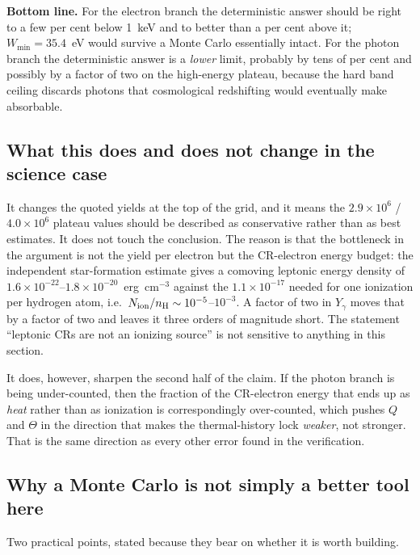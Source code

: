 \documentclass[11pt,a4paper]{article}
\begin{document}
\noindent
\textbf{Bottom line.}  For the electron branch the deterministic answer should
be right to a few per cent below 1~keV and to better than a per cent above it;
$W_{\min}=35.4$~eV would survive a Monte Carlo essentially intact.  For the
photon branch the deterministic answer is a \emph{lower} limit, probably by
tens of per cent and possibly by a factor of two on the high-energy plateau,
because the hard band ceiling discards photons that cosmological redshifting
would eventually make absorbable.

\subsection{What this does and does not change in the science case}

It changes the quoted yields at the top of the grid, and it means the
$2.9\times10^6$ / $4.0\times10^6$ plateau values should be described as
conservative rather than as best estimates.  It does not touch the conclusion.
The reason is that the bottleneck in the argument is not the yield per
electron but the CR-electron energy budget: the independent star-formation
estimate gives a comoving leptonic energy density of
$1.6\times10^{-22}$--$1.8\times10^{-20}$~erg~cm$^{-3}$ against the
$1.1\times10^{-17}$ needed for one ionization per hydrogen atom, i.e.\
$N_{\rm ion}/n_{\rm H}\sim10^{-5}$--$10^{-3}$.  A factor of two in $Y_\gamma$
moves that by a factor of two and leaves it three orders of magnitude short.
The statement ``leptonic CRs are not an ionizing source'' is not sensitive to
anything in this section.

It does, however, sharpen the second half of the claim.  If the photon branch
is being under-counted, then the fraction of the CR-electron energy that ends
up as \emph{heat} rather than as ionization is correspondingly over-counted,
which pushes $Q$ and $\Theta$ in the direction that makes the thermal-history
lock \emph{weaker}, not stronger.  That is the same direction as every other
error found in the verification.

\subsection{Why a Monte Carlo is not simply a better tool here}

Two practical points, stated because they bear on whether it is worth building.
\end{document}
